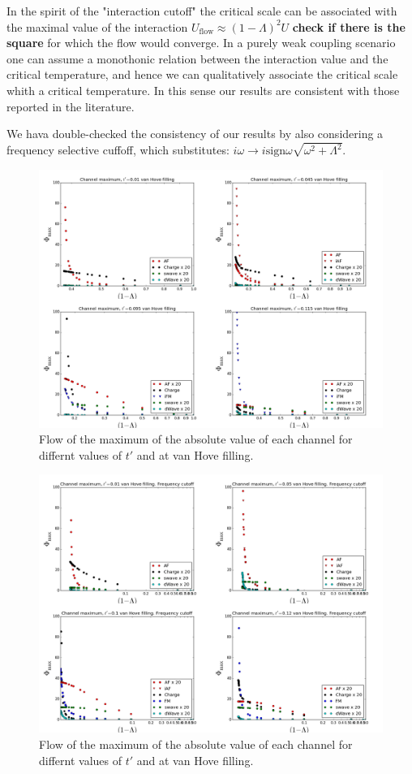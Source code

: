 In the spirit of the "interaction cutoff" the critical scale can be associated with the maximal value of the interaction $U_{\mathrm{flow}}\approx(1-\Lambda)^2 U$ \textbf{check if there is the square} for which the flow would converge. 
In a purely weak coupling scenario one can assume a monothonic relation between the interaction value and the critical temperature, and hence we can qualitatively associate the critical scale whith a critical temperature. In this sense our results are consistent with those reported in the literature. 

We hava double-checked the consistency of our results by also considering a frequency selective cuffoff, which substitutes: $i\omega \rightarrow i\mathrm{sign} \omega \sqrt{\omega^2+\Lambda^2}$. 

\begin{figure}
\includegraphics[scale=0.25]{images/vanhovelam.png}
\caption{Flow of the maximum of the absolute value of each channel for differnt values of $t'$ and at van Hove filling.
} 
\label{lamvan} 
\end{figure}

\begin{figure}
\includegraphics[scale=0.25]{images/freqvanhove.png}
\caption{Flow of the maximum of the absolute value of each channel for differnt values of $t'$ and at van Hove filling. } 
\label{freqlam} 
\end{figure}

